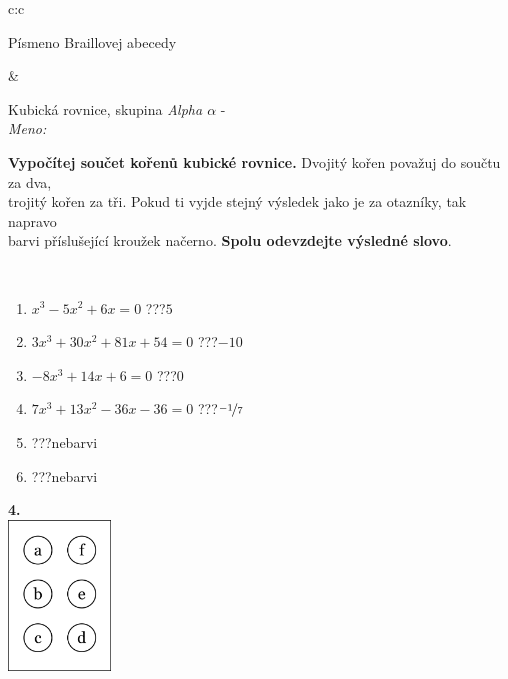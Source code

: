 \documentclass[10pt]{report}
\begin{document}
\begin{tabular}{c:c}
\begin{minipage}[c][104.5mm][t]{0.5\linewidth}
\begin{center}
\begin{minipage}{0.20\linewidth}
\begin{center}
{\small Písmeno Braillovej abecedy}
\end{center}
\end{minipage}
\end{center}
\end{minipage}
&
\begin{minipage}[c][104.5mm][t]{0.5\linewidth}
\begin{center}
\vspace{7mm}
{\huge Kubická rovnice, skupina \textit{Alpha $\alpha$} -}\\[5mm]
\textit{Meno:}\phantom{xxxxxxxxxxxxxxxxxxxxxxxxxxxxxxxxxxxxxxxxxxxxxxxxxxxxxxxxxxxxxxxxx}\\[5mm]
\begin{minipage}{0.95\linewidth}
\textbf{Vypočítej součet kořenů kubické rovnice.} Dvojitý kořen považuj do součtu za dva,\\trojitý kořen za tři. Pokud ti vyjde stejný výsledek jako je za otazníky, tak napravo\\barvi příslušející kroužek načerno. \textbf{Spolu odevzdejte výsledné slovo}.
\end{minipage}
\\[1mm]
\begin{minipage}{0.79\linewidth}
\begin{center}
\begin{varwidth}{\linewidth}
\begin{enumerate}
\Large
\item $x^3-5x^2+6x=0$\quad \dotfill\; ???\;\dotfill \quad $5$
\item $3x^3+30x^2+81x+54=0$\quad \dotfill\; ???\;\dotfill \quad $-10$
\item $-8x^3+14x+6=0$\quad \dotfill\; ???\;\dotfill \quad $0$
\item $7x^3+13x^2-36x-36=0$\quad \dotfill\; ???\;\dotfill \quad $\nicefrac{-1}{7}$
\item \quad \dotfill\; ???\;\dotfill \quad nebarvi
\item \quad \dotfill\; ???\;\dotfill \quad nebarvi
\end{enumerate}
\end{varwidth}
\end{center}
\end{minipage}
\begin{minipage}{0.20\linewidth}
\begin{center}
{\Huge\bfseries 4.} \\[2mm]
\includegraphics[height=40mm]{../images/braille.png}

\end{center}
\end{minipage}
\end{center}
\end{minipage}
\end{tabular}
\end{document}
